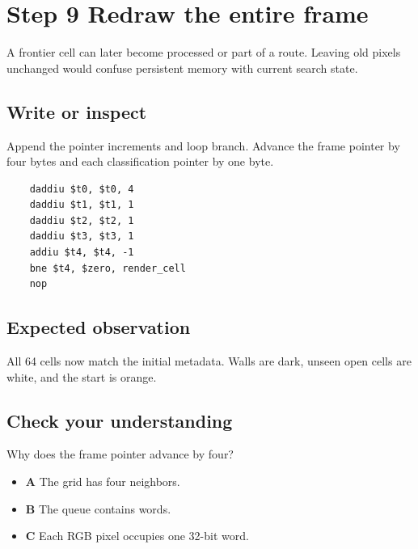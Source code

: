 \section{Step 9 Redraw the entire frame}\label{maze-s09}

A frontier cell can later become processed or part of a route. Leaving old pixels unchanged would confuse persistent memory with current search state.

\subsection{Write or inspect}

Append the pointer increments and loop branch. Advance the frame pointer by four bytes and each classification pointer by one byte.

\begin{verbatim}
    daddiu $t0, $t0, 4
    daddiu $t1, $t1, 1
    daddiu $t2, $t2, 1
    daddiu $t3, $t3, 1
    addiu $t4, $t4, -1
    bne $t4, $zero, render_cell
    nop
\end{verbatim}

\subsection{Expected observation}

All 64 cells now match the initial metadata. Walls are dark, unseen open cells are white, and the start is orange.

\subsection{Check your understanding}

Why does the frame pointer advance by four?

\begin{itemize}
  \item \textbf{A} The grid has four neighbors.
  \item \textbf{B} The queue contains words.
  \item \textbf{C} Each RGB pixel occupies one 32-bit word.
\end{itemize}
